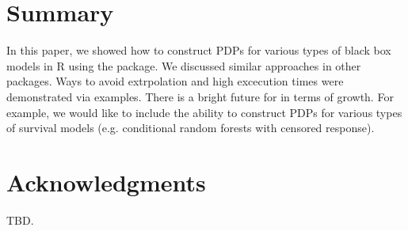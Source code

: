 \section{Summary}

In this paper, we showed how to construct PDPs for various types of black box models in R using the  package. We discussed similar approaches in other packages. Ways to avoid extrpolation and high excecution times were demonstrated via examples. There is a bright future for  in terms of growth. For example, we would like to include the ability to construct PDPs for various types of survival models (e.g. conditional random forests with censored response).


\section{Acknowledgments}

TBD.




\address{Brandon M. Greenwell\\
  Infoscitex Corporation\\
  4027 Colonel Glenn Highway\\
  Suite 210\\
  Dayton, OH 45431-1672\\
  United States of America\\}

